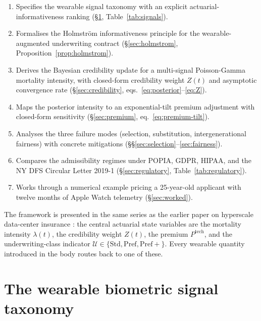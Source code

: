 \begin{enumerate}[leftmargin=*,nosep,topsep=4pt]
   \item Specifies the wearable signal taxonomy with an explicit
         actuarial-informativeness ranking
         (\S\ref{sec:taxonomy}, Table~\ref{tab:signals}).
   \item Formalises the Holmstr\"om informativeness principle for the
         wearable-augmented underwriting contract
         (\S\ref{sec:holmstrom}, Proposition~\ref{prop:holmstrom}).
   \item Derives the Bayesian credibility update for a multi-signal
         Poisson-Gamma mortality intensity, with closed-form
         credibility weight $Z(t)$ and asymptotic convergence rate
         (\S\ref{sec:credibility}, eqs.~\eqref{eq:posterior}--\eqref{eq:Z}).
   \item Maps the posterior intensity to an exponential-tilt premium
         adjustment with closed-form sensitivity
         (\S\ref{sec:premium}, eq.~\eqref{eq:premium-tilt}).
   \item Analyses the three failure modes (selection,
         substitution, intergenerational fairness) with concrete
         mitigations (\S\S\ref{sec:selection}--\ref{sec:fairness}).
   \item Compares the admissibility regimes under POPIA, GDPR, HIPAA,
         and the NY DFS Circular Letter 2019-1
         (\S\ref{sec:regulatory}, Table~\ref{tab:regulatory}).
   \item Works through a numerical example pricing a 25-year-old
         applicant with twelve months of Apple Watch telemetry
         (\S\ref{sec:worked}).
\end{enumerate}

The framework is presented in the same series as the earlier paper on
hyperscale data-center insurance \citep{Denewade2026DC}: the central
actuarial state variables are the mortality intensity $\lambda(t)$,
the credibility weight $Z(t)$, the premium $P^{\mathrm{tech}}$, and
the underwriting-class indicator $\mathcal{U}\in\{\mathrm{Std},
\mathrm{Pref},\mathrm{Pref+}\}$. Every wearable quantity introduced
in the body routes back to one of these.

\section{The wearable biometric signal taxonomy}\label{sec:taxonomy}

